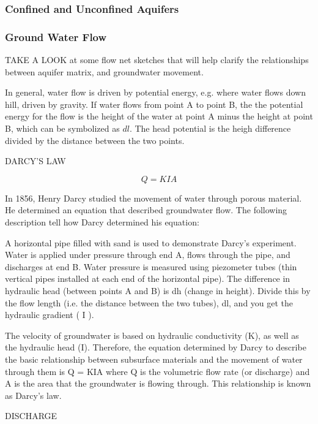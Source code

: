 \documentclass{book}\usepackage{knitr}
\begin{document}
\begin{knitrout}
\begin{kframe}
\subsubsection{Confined and Unconfined Aquifers}

\subsubsection{Ground Water Flow}

TAKE A LOOK at some flow net sketches that will help clarify the relationships between aquifer matrix, and groundwater movement.

In general, water flow is driven by potential energy, e.g.  where water flows down hill, driven by gravity. If water flows from point A to point B, the the potential energy for the flow is the height of the water at point A minus the height at point B, which can be symbolized as $dl$. The head potential is the heigh difference divided by the distance between the two points.  

DARCY'S LAW

\begin{equation}
Q = KIA
\end{equation}

In 1856, Henry Darcy studied the movement of water through porous material. He determined an equation that described groundwater flow. The following description tell how Darcy determined his equation:

A horizontal pipe filled with sand is used to demonstrate Darcy's experiment. Water is applied under pressure through end A, flows through the pipe, and discharges at end B. Water pressure is measured using piezometer tubes (thin vertical pipes installed at each end of the horizontal pipe). The difference in hydraulic head (between points A and B) is dh (change in height). Divide this by the flow length (i.e. the distance between the two tubes), dl, and you get the hydraulic gradient ( I ).

The velocity of groundwater is based on hydraulic conductivity (K), as well as the hydraulic head (I). Therefore, the equation determined by Darcy to describe the basic relationship between subsurface materials and the movement of water through them is Q = KIA where Q is the volumetric flow rate (or discharge) and A is the area that the groundwater is flowing through. This relationship is known as Darcy’s law.

DISCHARGE


\end{kframe}
\end{knitrout}
\end{document}
